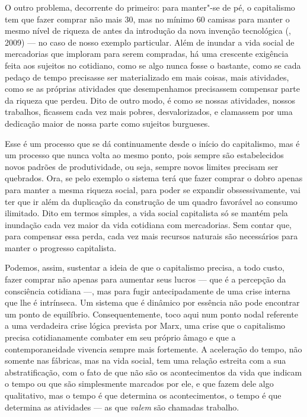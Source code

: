 O outro problema, decorrente do primeiro: para manter"-se de pé, o
capitalismo tem que fazer comprar não mais 30, mas no mínimo 60 camisas
para manter o mesmo nível de riqueza de antes da introdução da nova
invenção tecnológica (, 2009) --- no caso de nosso exemplo
particular. Além de inundar a vida social de mercadorias que imploram
para serem compradas, há uma crescente exigência feita aos sujeitos no
cotidiano, como se algo nunca fosse o bastante, como se cada pedaço de
tempo precisasse ser materializado em mais coisas, mais atividades, como
se as próprias atividades que desempenhamos precisassem compensar parte
da riqueza que perdeu. Dito de outro modo, é como se nossas atividades, nossos trabalhos, ficassem cada vez mais pobres, desvalorizados, e clamassem por uma dedicação maior de nossa parte como sujeitos burgueses.

Esse é um processo que se dá continuamente desde o início do
capitalismo, mas é um processo que nunca volta ao mesmo ponto, pois
sempre são estabelecidos novos padrões de produtividade, ou seja, sempre
novos limites precisam ser quebrados. Ora, se pelo exemplo o sistema
terá que fazer comprar o dobro apenas para manter a mesma riqueza
social, para poder se expandir obssessivamente, vai ter que ir além da duplicação da
construção de um quadro favorável ao consumo ilimitado. Dito em termos
simples, a vida social capitalista só se mantém pela inundação cada vez
maior da vida cotidiana com mercadorias. Sem contar que, para compensar
essa perda, cada vez mais recursos naturais são necessários para manter
o progresso capitalista.

Podemos, assim, sustentar a ideia de que o capitalismo precisa, a todo
custo, fazer comprar não apenas para aumentar seus lucros --- que é a
percepção da consciência cotidiana ---, mas para fugir antecipadamente de
uma crise interna que lhe é intrínseca. Um sistema que é dinâmico por
essência não pode encontrar um ponto de equilíbrio. Consequentemente,
toco aqui num ponto nodal referente a uma verdadeira crise lógica prevista por Marx, uma
crise que o capitalismo precisa cotidianamente combater em seu próprio
âmago e que a contemporaneidade vivencia sempre mais fortemente. A
aceleração do tempo, não somente nas fábricas, mas na vida social, tem
uma relação estreita com a sua abstratificação, com o fato de que não
são os acontecimentos da vida que indicam o tempo ou que são
simplesmente marcados por ele, e que fazem dele algo qualitativo, mas o
tempo é que determina os acontecimentos, o tempo é que determina as
atividades --- as que \emph{valem} são chamadas trabalho.


